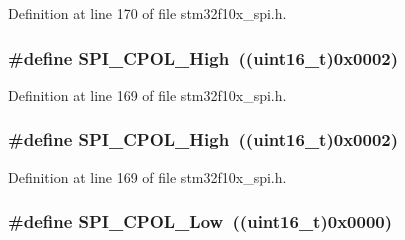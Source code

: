 Definition at line 170 of file stm32f10x\+\_\+spi.\+h.

\subsubsection[{\texorpdfstring{S\+P\+I\+\_\+\+C\+P\+O\+L\+\_\+\+High}{SPI_CPOL_High}}]{\setlength{\rightskip}{0pt plus 5cm}\#define S\+P\+I\+\_\+\+C\+P\+O\+L\+\_\+\+High~(({\bf uint16\+\_\+t})0x0002)}\hypertarget{group___s_p_i___clock___polarity_ga4431f2edf42f8298d5bbe693351edbb0}{}\label{group___s_p_i___clock___polarity_ga4431f2edf42f8298d5bbe693351edbb0}


Definition at line 169 of file stm32f10x\+\_\+spi.\+h.

\subsubsection[{\texorpdfstring{S\+P\+I\+\_\+\+C\+P\+O\+L\+\_\+\+High}{SPI_CPOL_High}}]{\setlength{\rightskip}{0pt plus 5cm}\#define S\+P\+I\+\_\+\+C\+P\+O\+L\+\_\+\+High~(({\bf uint16\+\_\+t})0x0002)}\hypertarget{group___s_p_i___clock___polarity_ga4431f2edf42f8298d5bbe693351edbb0}{}\label{group___s_p_i___clock___polarity_ga4431f2edf42f8298d5bbe693351edbb0}


Definition at line 169 of file stm32f10x\+\_\+spi.\+h.

\subsubsection[{\texorpdfstring{S\+P\+I\+\_\+\+C\+P\+O\+L\+\_\+\+Low}{SPI_CPOL_Low}}]{\setlength{\rightskip}{0pt plus 5cm}\#define S\+P\+I\+\_\+\+C\+P\+O\+L\+\_\+\+Low~(({\bf uint16\+\_\+t})0x0000)}\hypertarget{group___s_p_i___clock___polarity_ga3dbc0234c4b4e7c37137e7c189f3c085}{}\label{group___s_p_i___clock___polarity_ga3dbc0234c4b4e7c37137e7c189f3c085}


